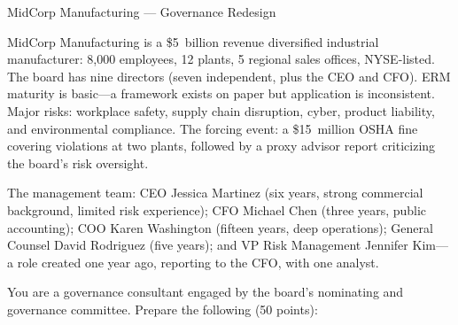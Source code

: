 \documentclass[11pt,openany]{book}
\begin{document}
\begin{minicase}{MidCorp Manufacturing --- Governance Redesign}

MidCorp Manufacturing is a \$5~billion revenue diversified industrial
manufacturer: 8,000 employees, 12 plants, 5 regional sales offices,
NYSE-listed. The board has nine directors (seven independent, plus the CEO
and CFO). ERM maturity is basic---a framework exists on paper but
application is inconsistent. Major risks: workplace safety, supply chain
disruption, cyber, product liability, and environmental compliance. The
forcing event: a \$15~million OSHA fine covering violations at two plants,
followed by a proxy advisor report criticizing the board's risk oversight.

The management team: CEO Jessica Martinez (six years, strong commercial
background, limited risk experience); CFO Michael Chen (three years, public
accounting); COO Karen Washington (fifteen years, deep operations); General
Counsel David Rodriguez (five years); and VP Risk Management Jennifer
Kim---a role created one year ago, reporting to the CFO, with one analyst.

You are a governance consultant engaged by the board's nominating and
governance committee. Prepare the following (50 points):


\end{minicase}
\end{document}
